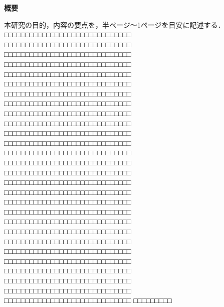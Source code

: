 \begin{center}
{\bf \Large 概要}
\end{center} 

本研究の目的，内容の要点を，半ページ～1ページを目安に記述する．
□□□□□□□□□□□□□□□□□□□□□□□□□□□□□□
□□□□□□□□□□□□□□□□□□□□□□□□□□□□□□
□□□□□□□□□□□□□□□□□□□□□□□□□□□□□□
□□□□□□□□□□□□□□□□□□□□□□□□□□□□□□
□□□□□□□□□□□□□□□□□□□□□□□□□□□□□□
□□□□□□□□□□□□□□□□□□□□□□□□□□□□□□
□□□□□□□□□□□□□□□□□□□□□□□□□□□□□□
□□□□□□□□□□□□□□□□□□□□□□□□□□□□□□
□□□□□□□□□□□□□□□□□□□□□□□□□□□□□□
□□□□□□□□□□□□□□□□□□□□□□□□□□□□□□
□□□□□□□□□□□□□□□□□□□□□□□□□□□□□□
□□□□□□□□□□□□□□□□□□□□□□□□□□□□□□
□□□□□□□□□□□□□□□□□□□□□□□□□□□□□□
□□□□□□□□□□□□□□□□□□□□□□□□□□□□□□
□□□□□□□□□□□□□□□□□□□□□□□□□□□□□□
□□□□□□□□□□□□□□□□□□□□□□□□□□□□□□
□□□□□□□□□□□□□□□□□□□□□□□□□□□□□□
□□□□□□□□□□□□□□□□□□□□□□□□□□□□□□
□□□□□□□□□□□□□□□□□□□□□□□□□□□□□□
□□□□□□□□□□□□□□□□□□□□□□□□□□□□□□
□□□□□□□□□□□□□□□□□□□□□□□□□□□□□□
□□□□□□□□□□□□□□□□□□□□□□□□□□□□□□
□□□□□□□□□□□□□□□□□□□□□□□□□□□□□□
□□□□□□□□□□□□□□□□□□□□□□□□□□□□□□
□□□□□□□□□□□□□□□□□□□□□□□□□□□□□□
□□□□□□□□□□□□□□□□□□□□□□□□□□□□□□
□□□□□□□□□□□□□□□□□□□□□□□□□□□□□□
□□□□□□□□□□□□□□□□□□□□□□□□□□□□□□
□□□□□□□□□